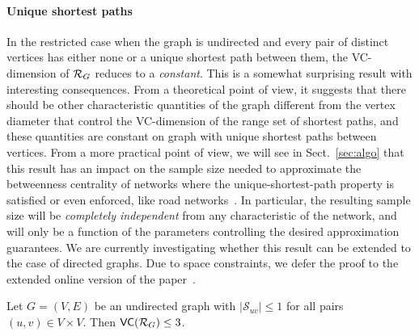 \paragraph{Unique shortest paths}\label{sec:rangeunique}
In the restricted case when the graph is undirected and
every pair of distinct vertices has either none or a unique shortest path
between them, the VC-dimension of $\mathcal{R}_G$ reduces %
to a \emph{constant}. This is a
somewhat surprising result with interesting consequences. From a theoretical
point of view, it suggests that there should be other characteristic
quantities of the graph different from the vertex diameter that control the
VC-dimension of the range set of shortest paths, and these quantities are
constant on graph with unique shortest paths between vertices. From a more
practical point of view, we will see in Sect.~\ref{sec:algo} that this result has an
impact on the sample size needed to approximate %
the betweenness centrality of
networks where the unique-shortest-path property is satisfied or even enforced,
like road networks~\citep{GeisbergerSS08}. In particular, the resulting sample
size will be \emph{completely independent} from any characteristic of the
network, and will only be a function of the parameters controlling the desired
approximation guarantees. We are currently investigating whether this result can
be extended to the case of directed graphs.
\ifproof
\else
Due to space constraints, we defer the proof to the extended online version of
the paper~\citep{RiondatoK13}.
\fi

\begin{lemma}\label{lem:vcdimuppboundunique}
  Let $G=(V,E)$ be an undirected graph with $|\mathcal{S}_{uv}|\le1$ for all
  pairs $(u,v)\in V\times V$. Then $\mathsf{VC}(\mathcal{R}_G)\le 3$.
\end{lemma}

